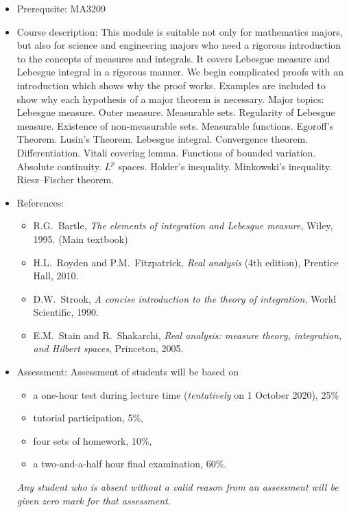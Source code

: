 \documentclass[a4paper]{article}
\begin{document}
\begin{itemize}
\item Prerequsite: MA3209
  
\item Course description: This module is suitable not only for mathematics majors, but also for science and engineering majors who need a rigorous introduction to the concepts of measures and integrals. It covers Lebesgue measure and Lebesgue integral in a rigorous manner. We begin complicated proofs with an introduction which shows why the proof works. Examples are included to show why each hypothesis of a major theorem is necessary. Major topics: Lebesgue measure. Outer measure. Measurable sets. Regularity of Lebesgue measure. Existence of non-measurable sets. Measurable functions. Egoroff’s Theorem. Lusin’s Theorem. Lebesgue integral. Convergence theorem. Differentiation. Vitali covering lemma. Functions of bounded variation. Absolute continuity. $L^p$ spaces. Holder’s inequality. Minkowski’s inequality. Riesz--Fischer theorem.
  
\item References:
  \begin{itemize}
  \item
    R.G.~Bartle, \emph{The elements of integration and Lebesgue measure}, Wiley, 1995. (Main textbook)
  \item    
    H.L.~Royden and P.M.~Fitzpatrick, \emph{Real analysis} (4th edition), Prentice Hall, 2010.
  \item
    D.W.~Strook, \emph{A concise introduction to the theory of integration}, World Scientific, 1990.
  \item
    E.M.~Stain and R.~Shakarchi, \emph{Real analysis: measure theory, integration, and Hilbert spaces}, Princeton, 2005.
  \end{itemize}
\item Assessment:
  Assessment of students will be based on
  \begin{itemize}
  \item a one-hour test during lecture time (\emph{tentatively} on 1 October 2020), 25\%
  \item tutorial participation, 5\%,
  \item four sets of homework, 10\%,
  \item a two-and-a-half hour final examination, 60\%.
  \end{itemize}
  \emph{Any student who is absent without a valid reason from an assessment will be given zero mark for that assessment.}
\end{itemize}
\end{document}
